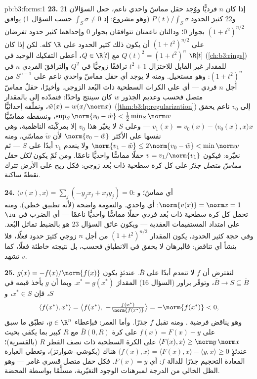 \begin{solution}{pb:b3:forms:1}
\textbf{23.} إذا كان $n$ فرديًّا ووُجد حقل مماسّ واحدي ناعم،
جعل السؤالان 21 و22 كثيرَ الحدود $P(t)/\int_S\sigma$ (وهو مشروع: إذ $\int_S\sigma \neq 0$
حسب السؤال 1) يوافق $(1 + t^2)^{n/2}$ بجوار $0$؛ ودالتان ناعمتان
تتوافقان بجوار $0$ وإحداهما كثير حدود تفرضان على $(1 + t^2)^{n/2}$ أن
يكون ذلك كثير الحدود على $\R$ كله. لكن إذا كان $Q(t)^2 = (1 + t^2)^n$ مع
$Q \in \R[t]$، أعطى التفكيك الوحيد في $\R[t]$ (\cref{ch:b3:rings})
للمقدار غير القابل للاختزال $t^2 + 1$ ترافقًا زوجيًّا في $Q^2$
والترافقَ الفردي $n$ في $(1 + t^2)^n$: وهو مستحيل. ومنه لا يوجد
أي حقل مماسّ واحدي ناعم على $S^{n-1}$ من أجل $n$ فردي --- أي
على الكرات السطحية ذات البُعد الزوجي. وأخيرًا، حقلٌ مماسّ متصل
فحسب وعديم الجذور $w$ كان سينتج واحدًا: فنمدّده إلى 
بالمقدار $\tilde w(x) = w(x/\norm x)$، ونملّفه إحداثيًّا (\cref{thm:b3:lp:regularization}) إلى $v_0$
ناعم يحقق $\sup_S\norm{v_0 - \tilde w} <
\frac12\min_S\norm w$، ونسقطه مماسّيًّا $v_1(x) = v_0(x)
- \langle v_0(x), x\rangle x$ --- وعلى $S$ لا
يغيّر هذا $v_0$ إلا بمركّبته الناظمية، وهي نفسها على الأكثر
$\norm{v_0 -
\tilde w}$ لأن $\tilde w$ مماسّي، ومنه $\norm{v_1 - \tilde
w} \leq 2\norm{v_0 - \tilde w} < \min\norm w$ ولا ينعدم $v_1$
أبدًا على $S$ --- ثم نعيّره: فيكون $v =
v_1/\norm{v_1}$ حقلًا مماسًّا
واحديًّا ناعمًا. ومن ثَمّ يكون \emph{لكل حقل مماسّ متصل جذرٌ}
على كل كرة سطحية ذات بُعد زوجي: فكل ريح على الأرض تترك نقطةً
ساكنة.

\textbf{24.} $\langle v(x), x\rangle = \sum_j(-y_jx_j +
x_jy_j) = 0$: أي مماسّ؛ و $\norm{v(x)} = \norm x = 1$: أي واحدي. والنعومة
واضحة (لأنه تطبيق خطي). ومنه تحمل كل كرة سطحية ذات بُعد فردي
حقلًا مماسًّا واحديًّا ناعمًا --- أي الضرب في $\iu$ على امتداد
المستقيمات العقدية --- ويكون عائق السؤال 23 هو بالضبط تماثل
البُعد. وفي حجة كثير الحدود، يكون المقدار $(1 +
t^2)^{n/2}$ من أجل $n$
زوجي كثيرَ حدود \emph{فعلًا}، فلا ينشأ أي تناقض: فالبرهان لا
يخفق في الانطباق فحسب، بل نتيجته خاطئة فعلًا، كما تشهد $v$.

\textbf{25.} لنفترض أن $f$ لا تنعدم أبدًا على $\bar B$. عندئذٍ
يكون $g(x) = -f(x)/\norm{f(x)}$  $\bar B \to S
\subseteq \bar B$، وتوفّر براور (السؤال 16) المقدارَ
$x^* =
g(x^*)$. وبما أن $g$ يأخذ قيمه في $S$، فإن $x^* \in S$، و
\[
\langle f(x^*), x^*\rangle = \bigl\langle f(x^*),\
-\tfrac{f(x^*)}{\norm{f(x^*)}}\bigr\rangle
= -\norm{f(x^*)} < 0,
\]
وهو يناقض فرضية . ومنه تقبل $f$ جذرًا. وأما الغمر: فبإعطاء
$y \in \R^n$، نطبّق ما سبق على $f(x) =
F(x) - y$ على كرة $\bar B(0, R)$
مع $R$ كبير بما يكفي بحيث $\langle F(x), x\rangle \geq \norm y\,\norm x$ على الكرة السطحية ذات نصف
القطر $R$ (بالقسرية)؛ عندئذٍ $\langle f(x), x\rangle =
\langle F(x), x\rangle - \langle y, x\rangle \geq 0$ هناك (بكوشي--شوارتز)،
وتعطي العبارة المعادة التحجيم جذرًا للدالة $f$: أي $F(x) = y$.
فكل حقل متصل قسري غامر --- وهو الظل الخالي من الدرجة لمبرهنات
الوجود التغيّرية، مسلَّمًا بواسطة  المحضة.
\end{solution}
